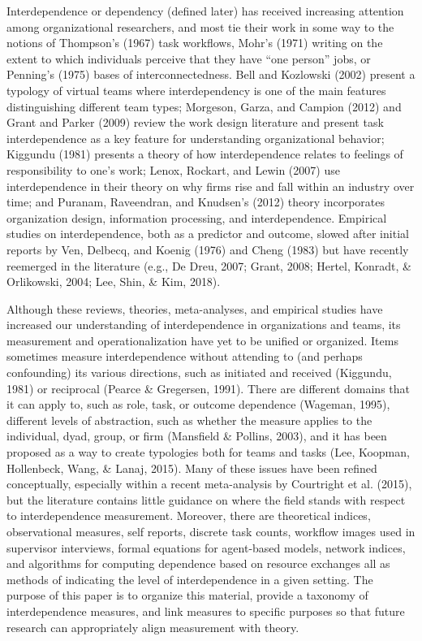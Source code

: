 \documentclass[english,,man]{apa6}
\theoremstyle{definition}
\theoremstyle{definition}
\theoremstyle{definition}
\theoremstyle{remark}
\begin{document}
Interdependence or dependency (defined later) has received increasing
attention among organizational researchers, and most tie their work in
some way to the notions of Thompson's (1967) task workflows, Mohr's
(1971) writing on the extent to which individuals perceive that they
have \enquote{one person} jobs, or Penning's (1975) bases of
interconnectedness. Bell and Kozlowski (2002) present a typology of
virtual teams where interdependency is one of the main features
distinguishing different team types; Morgeson, Garza, and Campion (2012)
and Grant and Parker (2009) review the work design literature and
present task interdependence as a key feature for understanding
organizational behavior; Kiggundu (1981) presents a theory of how
interdependence relates to feelings of responsibility to one's work;
Lenox, Rockart, and Lewin (2007) use interdependence in their theory on
why firms rise and fall within an industry over time; and Puranam,
Raveendran, and Knudsen's (2012) theory incorporates organization
design, information processing, and interdependence. Empirical studies
on interdependence, both as a predictor and outcome, slowed after
initial reports by Ven, Delbecq, and Koenig (1976) and Cheng (1983) but
have recently reemerged in the literature (e.g., De Dreu, 2007; Grant,
2008; Hertel, Konradt, \& Orlikowski, 2004; Lee, Shin, \& Kim, 2018).

Although these reviews, theories, meta-analyses, and empirical studies
have increased our understanding of interdependence in organizations and
teams, its measurement and operationalization have yet to be unified or
organized. Items sometimes measure interdependence without attending to
(and perhaps confounding) its various directions, such as initiated and
received (Kiggundu, 1981) or reciprocal (Pearce \& Gregersen, 1991).
There are different domains that it can apply to, such as role, task, or
outcome dependence (Wageman, 1995), different levels of abstraction,
such as whether the measure applies to the individual, dyad, group, or
firm (Mansfield \& Pollins, 2003), and it has been proposed as a way to
create typologies both for teams and tasks (Lee, Koopman, Hollenbeck,
Wang, \& Lanaj, 2015). Many of these issues have been refined
conceptually, especially within a recent meta-analysis by Courtright et
al. (2015), but the literature contains little guidance on where the
field stands with respect to interdependence measurement. Moreover,
there are theoretical indices, observational measures, self reports,
discrete task counts, workflow images used in supervisor interviews,
formal equations for agent-based models, network indices, and algorithms
for computing dependence based on resource exchanges all as methods of
indicating the level of interdependence in a given setting. The purpose
of this paper is to organize this material, provide a taxonomy of
interdependence measures, and link measures to specific purposes so that
future research can appropriately align measurement with theory.
\end{document}
